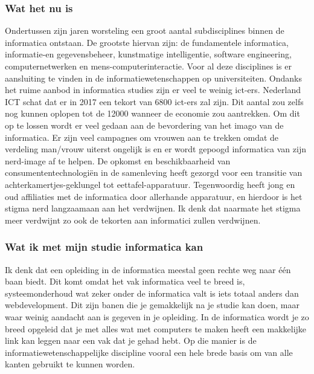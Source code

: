 \documentclass[pdftex,12pt,a4paper]{article}
\begin{document}
\subsubsection{Wat het nu is}
Ondertussen zijn jaren worsteling een groot aantal subdisciplines binnen de informatica ontstaan. De grootste hiervan zijn: de fundamentele informatica, informatie-en gegevensbeheer, kunstmatige intelligentie, software engineering, computernetwerken en mens-computerinteractie. Voor al deze disciplines is er aansluiting te vinden in de informatiewetenschappen op universiteiten.
Ondanks het ruime aanbod in informatica studies zijn er veel te weinig ict-ers. Nederland ICT schat dat er in 2017 een tekort van 6800 ict-ers zal zijn. Dit aantal zou zelfs nog kunnen oplopen tot de 12000 wanneer de economie zou aantrekken. Om dit op te lossen wordt er veel gedaan aan de bevordering van het imago van de informatica. Er zijn veel campagnes om vrouwen aan te trekken omdat de verdeling man/vrouw uiterst ongelijk is en er wordt gepoogd informatica van zijn nerd-image af te helpen. De opkomst en beschikbaarheid van consumententechnologiën in de samenleving heeft gezorgd voor een transitie van achterkamertjes-geklungel tot eettafel-apparatuur. Tegenwoordig heeft jong en oud affiliaties met de informatica door allerhande apparatuur, en hierdoor is het stigma nerd langzaamaan aan het verdwijnen. Ik denk dat naarmate het stigma meer verdwijnt zo ook de tekorten aan informatici zullen verdwijnen. 
\subsubsection{Wat ik met mijn studie informatica kan}
Ik denk dat een opleiding in de informatica meestal geen rechte weg naar één baan biedt. Dit komt omdat het vak informatica veel te breed is, systeemonderhoud wat zeker onder de informatica valt is iets totaal anders dan webdevelopment. Dit zijn banen die je gemakkelijk na je studie kan doen, maar waar weinig aandacht aan is gegeven in je opleiding. In de informatica wordt je zo breed opgeleid dat je met alles wat met computers te maken heeft een makkelijke link kan leggen naar een vak dat je gehad hebt. Op die manier is de informatiewetenschappelijke discipline vooral een hele brede basis om van alle kanten gebruikt te kunnen worden.
\end{document}
